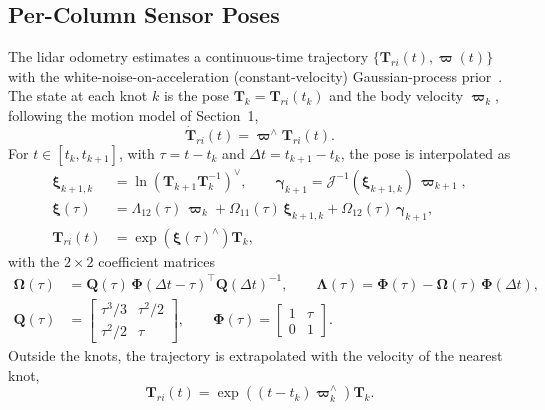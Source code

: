 \subsection{Per-Column Sensor Poses}
The lidar odometry estimates a continuous-time trajectory $\{\mathbf{T}_{ri}(t), \bm{\varpi}(t)\}$ with the white-noise-on-acceleration (constant-velocity) Gaussian-process prior~\citep{anderson2015relative,barfoot2024state}. The state at each knot $k$ is the pose $\mathbf{T}_k = \mathbf{T}_{ri}(t_k)$ and the body velocity $\bm{\varpi}_k$, following the motion model of Section~1,
\begin{equation}
    \dot{\mathbf{T}}_{ri}(t) = \bm{\varpi}^{\wedge}\mathbf{T}_{ri}(t).
\end{equation}
For $t \in [t_k, t_{k+1}]$, with $\tau = t - t_k$ and $\Delta t = t_{k+1} - t_k$, the pose is interpolated as
\begin{equation}
    \label{eq:traj_interp}
\begin{split}
    \bm{\xi}_{k+1,k} &= \ln\left(\mathbf{T}_{k+1}\mathbf{T}_k^{-1}\right)^{\vee}, \qquad
    \bm{\gamma}_{k+1} = \mathcal{J}^{-1}(\bm{\xi}_{k+1,k})\,\bm{\varpi}_{k+1}, \\
    \bm{\xi}(\tau) &= \Lambda_{12}(\tau)\,\bm{\varpi}_k + \Omega_{11}(\tau)\,\bm{\xi}_{k+1,k} + \Omega_{12}(\tau)\,\bm{\gamma}_{k+1}, \\
    \mathbf{T}_{ri}(t) &= \exp\left(\bm{\xi}(\tau)^{\wedge}\right)\mathbf{T}_k,
\end{split}
\end{equation}
with the $2\times2$ coefficient matrices
\begin{equation}
\begin{split}
    \bm{\Omega}(\tau) &= \mathbf{Q}(\tau)\,\bm{\Phi}(\Delta t- \tau)^{\top}\mathbf{Q}(\Delta t)^{-1}, \qquad
    \bm{\Lambda}(\tau) = \bm{\Phi}(\tau) - \bm{\Omega}(\tau)\,\bm{\Phi}(\Delta t), \\
    \mathbf{Q}(\tau) &= \begin{bmatrix} \tau^3/3 & \tau^2/2 \\ \tau^2/2 & \tau \end{bmatrix}, \qquad
    \bm{\Phi}(\tau) = \begin{bmatrix} 1 & \tau \\ 0 & 1 \end{bmatrix}.
\end{split}
\end{equation}
Outside the knots, the trajectory is extrapolated with the velocity of the nearest knot,
\begin{equation}
    \label{eq:traj_extrap}
    \mathbf{T}_{ri}(t) = \exp\left((t - t_k)\bm{\varpi}_k^{\wedge}\right)\mathbf{T}_k.
\end{equation}
